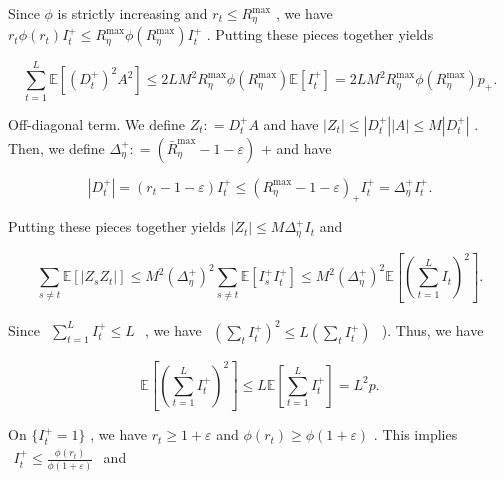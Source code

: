 \documentclass[
  10
]{article}
\begin{document}
Since \(\phi\) is strictly increasing and
\(r _ { t } \le R _ { \eta } ^ { \mathrm { m a x } }\) , we have
\(r _ { t } \phi ( r _ { t } ) I _ { t } ^ { + } \leq R _ { \eta } ^ { \operatorname* { m a x } } \phi ( R _ { \eta } ^ { \operatorname* { m a x } } ) I _ { t } ^ { + }\)
. Putting these pieces together yields

\[
\sum_ {t = 1} ^ {L} \mathbb {E} [ (D _ {t} ^ {+}) ^ {2} A ^ {2} ] \leq 2 L M ^ {2} R _ {\eta} ^ {\max} \phi (R _ {\eta} ^ {\max}) \mathbb {E} [ I _ {t} ^ {+} ] = 2 L M ^ {2} R _ {\eta} ^ {\max} \phi (R _ {\eta} ^ {\max}) p _ {+}. \tag {12}
\]

Off-diagonal term. We define \(Z _ { t } : = D _ { t } ^ { + } A\) and
have
\(\left| Z _ { t } \right| \leq | D _ { t } ^ { + } | | A | \leq M | D _ { t } ^ { + } |\)
. Then, we define
\(\Delta _ { \eta } ^ { + } : = ( \bar { R } _ { \eta } ^ { \operatorname* { m a x } } - 1 - \varepsilon )\)
+ and have

\[
| D _ {t} ^ {+} | = (r _ {t} - 1 - \varepsilon) I _ {t} ^ {+} \leq (R _ {\eta} ^ {\mathrm{max}} - 1 - \varepsilon) _ {+} I _ {t} ^ {+} = \Delta_ {\eta} ^ {+} I _ {t} ^ {+}.
\]

Putting these pieces together yields
\(| Z _ { t } | \le M \Delta _ { \eta } ^ { + } I _ { t }\) and

\[
\sum_ {s \neq t} \mathbb {E} [ | Z _ {s} Z _ {t} | ] \leq M ^ {2} (\Delta_ {\eta} ^ {+}) ^ {2} \sum_ {s \neq t} \mathbb {E} [ I _ {s} ^ {+} I _ {t} ^ {+} ] \leq M ^ {2} (\Delta_ {\eta} ^ {+}) ^ {2} \mathbb {E} \left[ \left(\sum_ {t = 1} ^ {L} I _ {t}\right) ^ {2} \right]. \tag {13}
\]

Since
\(\begin{array} { r } { \sum _ { t = 1 } ^ { L } I _ { t } ^ { + } \leq L } \end{array}\)
, we have
\(\begin{array} { r } { ( \sum _ { t } I _ { t } ^ { + } ) ^ { 2 } \leq L ( \sum _ { t } I _ { t } ^ { + } ) } \end{array}\)
). Thus, we have

\[
\mathbb {E} \left[ \left(\sum_ {t = 1} ^ {L} I _ {t} ^ {+}\right) ^ {2} \right] \leq L \mathbb {E} \left[ \sum_ {t = 1} ^ {L} I _ {t} ^ {+} \right] = L ^ {2} p.
\]

On \(\{ I _ { t } ^ { + } = 1 \}\) , we have
\(r _ { t } \ge 1 + \varepsilon\) and
\(\phi ( r _ { t } ) \geq \phi ( 1 + \varepsilon )\) . This implies
\(\begin{array} { r } { I _ { t } ^ { + } \le \frac { \phi ( r _ { t } ) } { \phi ( 1 + \varepsilon ) } } \end{array}\)
and
\end{document}
